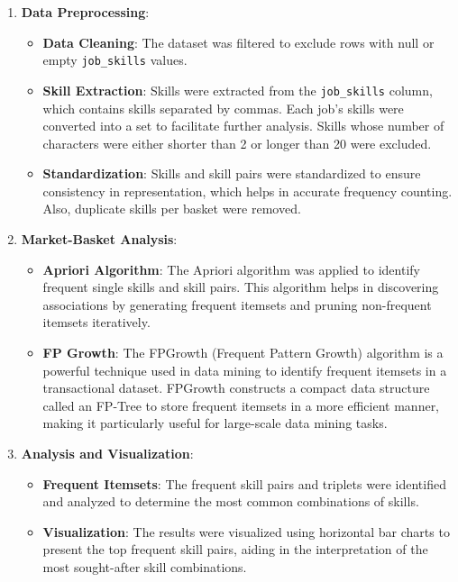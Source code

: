 \documentclass{article}
\begin{document}
\begin{enumerate}
    \item \textbf{Data Preprocessing}:
    \begin{itemize}
        \item \textbf{Data Cleaning}: The dataset was filtered to exclude rows with null or empty \texttt{job\_skills} values.
        \item \textbf{Skill Extraction}: Skills were extracted from the \texttt{job\_skills} column, which contains skills separated by commas. Each job's skills were converted into a set to facilitate further analysis. Skills whose number of characters were either shorter than 2 or longer than 20 were excluded.
        \item \textbf{Standardization}: Skills and skill pairs were standardized to ensure consistency in representation, which helps in accurate frequency counting. Also, duplicate skills per basket were removed.
    \end{itemize}
    
    \item \textbf{Market-Basket Analysis}:
    \begin{itemize}
        \item \textbf{Apriori Algorithm}: The Apriori algorithm was applied to identify frequent single skills and skill pairs. This algorithm helps in discovering associations by generating frequent itemsets and pruning non-frequent itemsets iteratively.
        \item \textbf{FP Growth}: The FPGrowth (Frequent Pattern Growth) algorithm is a powerful technique used in data mining to identify frequent itemsets in a transactional dataset. FPGrowth constructs a compact data structure called an FP-Tree to store frequent itemsets in a more efficient manner, making it particularly useful for large-scale data mining tasks.

    \end{itemize}
    
    \item \textbf{Analysis and Visualization}:
    \begin{itemize}
        \item \textbf{Frequent Itemsets}: The frequent skill pairs and triplets were identified and analyzed to determine the most common combinations of skills.
        \item \textbf{Visualization}: The results were visualized using horizontal bar charts to present the top frequent skill pairs, aiding in the interpretation of the most sought-after skill combinations.
    \end{itemize}
\end{enumerate}
\end{document}
